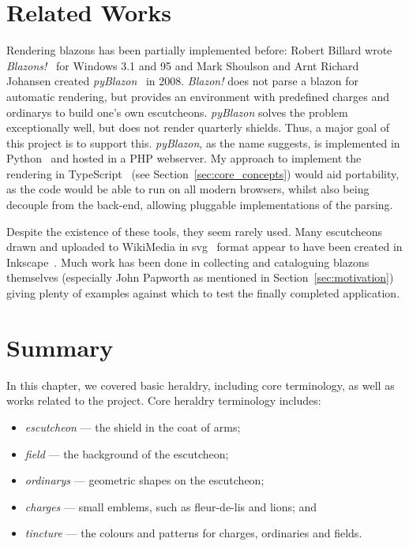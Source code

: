\documentclass[nobib, a4paper, twoside, justified]{tufte-book}
\makeatletter
\newcommand{\svg}{\gls{svg}\@\xspace}
\newcommand{\charges}{\glspl{charge}\@\xspace}
\newcommand{\blazons}{\glspl{blazon}\@\xspace}
\makeatother
\begin{document}
\section{Related Works}%
\label{sec:related_works}

Rendering \blazons has been partially implemented before: Robert Billard wrote
\textit{Blazons!}~\autocite{dos_blazon} for Windows 3.1 and 95 and Mark Shoulson and Arnt Richard
Johansen created \textit{pyBlazon}~\autocite{pyblazon} in 2008. \textit{Blazon!} does not parse a
blazon for automatic rendering, but provides an environment with predefined \charges and
\glspl{ordinary} to build one's own \glspl{escutcheon}. \textit{pyBlazon} solves the problem
exceptionally well, but does not render quarterly shields. Thus, a major goal of this project is to
support this. \textit{pyBlazon}, as the name suggests, is implemented in Python~\autocite{python}
and hosted in a PHP webserver. My approach to implement the rendering in
TypeScript~\autocite{typescript} (see Section~\ref{sec:core_concepts}) would aid portability, as
the code would be able to run on all modern browsers, whilst also being decouple from the back-end,
allowing pluggable implementations of the parsing.

Despite the existence of these tools, they seem rarely used. Many escutcheons drawn and uploaded to
WikiMedia in \svg~\autocite{ferraiolo2000scalable} format appear to have been created in
Inkscape~\autocite{inkscape}. Much work has been done in collecting and cataloguing \blazons
themselves (especially John Papworth as mentioned in Section~\ref{sec:motivation}) giving plenty of
examples against which to test the finally completed application.

\section{Summary}%
\label{sec:background_summary}

In this chapter, we covered basic heraldry, including core terminology, as well as works related to
the project. Core heraldry terminology includes:

\pagebreak%

\begin{itemize}
  \item \textit{\Gls{escutcheon}} --- the shield in the coat of arms;
  \item \textit{\Gls{field}} --- the background of the escutcheon;
  \item \textit{\Glspl{ordinary}} --- geometric shapes on the escutcheon;
  \item \textit{\Glspl{charge}} --- small emblems, such as fleur-de-lis and lions; and
  \item \textit{\Gls{tincture}} --- the colours and patterns for \charges, ordinaries and fields.
\end{itemize}
\end{document}
